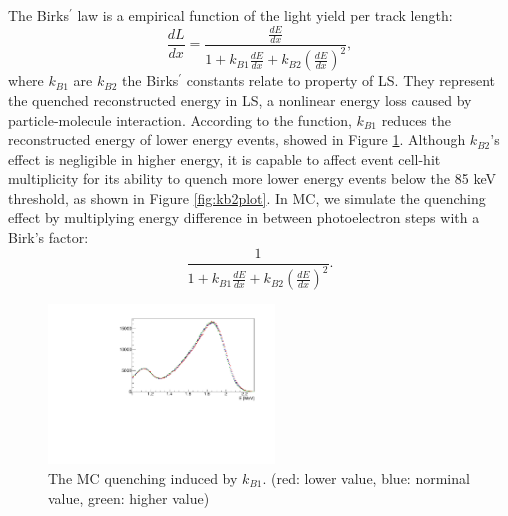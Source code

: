 The Birks$^\prime$ law is a empirical function of the light yield per track length:
\begin{equation}
    \frac{dL}{dx} = \frac{\frac{dE}{dx}}{1+k_{B1}\frac{dE}{dx}+k_{B2}(\frac{dE}{dx})^2},
\end{equation}
where $k_{B1}$ are $k_{B2}$ the Birks$^\prime$ constants relate to property of LS. 
They represent the quenched reconstructed energy in LS, a nonlinear energy loss caused by particle-molecule interaction. 
According to the function, $k_{B1}$ reduces the reconstructed energy of lower energy events, showed in Figure \ref{fig:kb1plot}.
Although $k_{B2}$'s effect is negligible in higher energy, it is capable to affect event cell-hit multiplicity for its ability to quench more lower energy events below the 85 keV threshold, as shown in Figure \ref{fig:kb2plot}.
In MC, we  simulate the quenching effect by multiplying energy difference in between photoelectron steps with a Birk's factor:
\begin{equation}
   \frac{1}{1+k_{B1}\frac{dE}{dx}+k_{B2}(\frac{dE}{dx})^2}.
   \label{eql:birks}
\end{equation}

\begin{figure}[h!]
\centering
\includegraphics[width=60mm]{Figures/kb1.pdf}
\caption{The MC quenching induced by $k_{B1}$. (red: lower value, blue: norminal value, green: higher value)}
\label{fig:kb1plot}
\end{figure}
 
